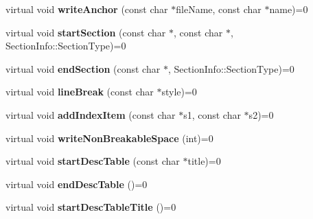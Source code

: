 \begin{DoxyCompactItemize}
\item 
\hypertarget{class_base_output_doc_interface_a0d42feda33a9f9e93cb8029153f75e71}{virtual void {\bfseries write\-Anchor} (const char $\ast$file\-Name, const char $\ast$name)=0}\label{class_base_output_doc_interface_a0d42feda33a9f9e93cb8029153f75e71}

\item 
\hypertarget{class_base_output_doc_interface_ad4b9e394b4c79f853a1eca24ae4ba484}{virtual void {\bfseries start\-Section} (const char $\ast$, const char $\ast$, Section\-Info\-::\-Section\-Type)=0}\label{class_base_output_doc_interface_ad4b9e394b4c79f853a1eca24ae4ba484}

\item 
\hypertarget{class_base_output_doc_interface_af91f19bb7a7184047d63922c69a54d03}{virtual void {\bfseries end\-Section} (const char $\ast$, Section\-Info\-::\-Section\-Type)=0}\label{class_base_output_doc_interface_af91f19bb7a7184047d63922c69a54d03}

\item 
\hypertarget{class_base_output_doc_interface_a82de4067c71b25dd85188ba11ab8afe9}{virtual void {\bfseries line\-Break} (const char $\ast$style)=0}\label{class_base_output_doc_interface_a82de4067c71b25dd85188ba11ab8afe9}

\item 
\hypertarget{class_base_output_doc_interface_a74c8bc475204c698ea98a421072c41ac}{virtual void {\bfseries add\-Index\-Item} (const char $\ast$s1, const char $\ast$s2)=0}\label{class_base_output_doc_interface_a74c8bc475204c698ea98a421072c41ac}

\item 
\hypertarget{class_base_output_doc_interface_af3caea4d221cbde42831678ae6ceca91}{virtual void {\bfseries write\-Non\-Breakable\-Space} (int)=0}\label{class_base_output_doc_interface_af3caea4d221cbde42831678ae6ceca91}

\item 
\hypertarget{class_base_output_doc_interface_a6daf06bdc37871cb56b47d0eadbea62b}{virtual void {\bfseries start\-Desc\-Table} (const char $\ast$title)=0}\label{class_base_output_doc_interface_a6daf06bdc37871cb56b47d0eadbea62b}

\item 
\hypertarget{class_base_output_doc_interface_a7c632b8cacd65f2b923b2723561a017d}{virtual void {\bfseries end\-Desc\-Table} ()=0}\label{class_base_output_doc_interface_a7c632b8cacd65f2b923b2723561a017d}

\item 
\hypertarget{class_base_output_doc_interface_a531193736655add8e7d8c72416480fbe}{virtual void {\bfseries start\-Desc\-Table\-Title} ()=0}\label{class_base_output_doc_interface_a531193736655add8e7d8c72416480fbe}


\end{DoxyCompactItemize}
